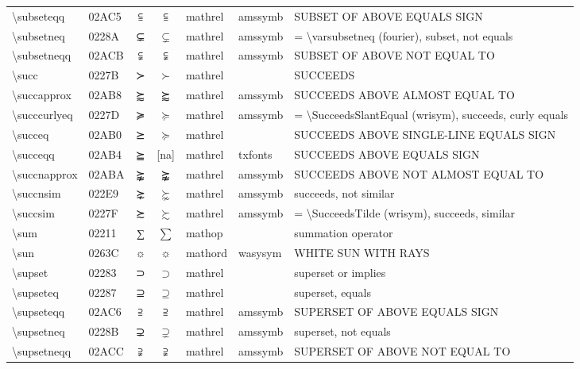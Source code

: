 \documentclass[a4paper,landscape]{article}
\begin{document}
\begin{longtable}{llcclll}
\textbackslash{}subseteqq & 02AC5 & ⫅ & $\subseteqq$ & mathrel & amssymb & SUBSET OF ABOVE EQUALS SIGN \\
\textbackslash{}subsetneq & 0228A & ⊊ & $\subsetneq$ & mathrel & amssymb & = \textbackslash{}varsubsetneq (fourier), subset, not equals \\
\textbackslash{}subsetneqq & 02ACB & ⫋ & $\subsetneqq$ & mathrel & amssymb & SUBSET OF ABOVE NOT EQUAL TO \\
\textbackslash{}succ & 0227B & ≻ & $\succ$ & mathrel &  & SUCCEEDS \\
\textbackslash{}succapprox & 02AB8 & ⪸ & $\succapprox$ & mathrel & amssymb & SUCCEEDS ABOVE ALMOST EQUAL TO \\
\textbackslash{}succcurlyeq & 0227D & ≽ & $\succcurlyeq$ & mathrel & amssymb & = \textbackslash{}SucceedsSlantEqual (wrisym), succeeds, curly equals \\
\textbackslash{}succeq & 02AB0 & ⪰ & $\succeq$ & mathrel &  & SUCCEEDS ABOVE SINGLE-LINE EQUALS SIGN \\
\textbackslash{}succeqq & 02AB4 & ⪴ & [na] & mathrel & txfonts & SUCCEEDS ABOVE EQUALS SIGN \\
\textbackslash{}succnapprox & 02ABA & ⪺ & $\succnapprox$ & mathrel & amssymb & SUCCEEDS ABOVE NOT ALMOST EQUAL TO \\
\textbackslash{}succnsim & 022E9 & ⋩ & $\succnsim$ & mathrel & amssymb & succeeds, not similar \\
\textbackslash{}succsim & 0227F & ≿ & $\succsim$ & mathrel & amssymb & = \textbackslash{}SucceedsTilde (wrisym), succeeds, similar \\
\textbackslash{}sum & 02211 & ∑ & $\sum$ & mathop &  & summation operator \\
\textbackslash{}sun & 0263C & \textsf ☼ & $\sun$ & mathord & wasysym & WHITE SUN WITH RAYS \\
\textbackslash{}supset & 02283 & ⊃ & $\supset$ & mathrel &  & superset or implies \\
\textbackslash{}supseteq & 02287 & ⊇ & $\supseteq$ & mathrel &  & superset, equals \\
\textbackslash{}supseteqq & 02AC6 & ⫆ & $\supseteqq$ & mathrel & amssymb & SUPERSET OF ABOVE EQUALS SIGN \\
\textbackslash{}supsetneq & 0228B & ⊋ & $\supsetneq$ & mathrel & amssymb & superset, not equals \\
\textbackslash{}supsetneqq & 02ACC & ⫌ & $\supsetneqq$ & mathrel & amssymb & SUPERSET OF ABOVE NOT EQUAL TO \\

\end{longtable}
\end{document}
